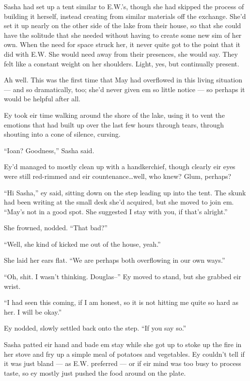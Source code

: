 Sasha had set up a tent similar to E.W.'s, though she had skipped the process of building it herself, instead creating from similar materials off the exchange. She'd set it up nearly on the other side of the lake from their house, so that she could have the solitude that she needed without having to create some new sim of her own. When the need for space struck her, it never quite got to the point that it did with E.W. She would need away from their presences, she would say. They felt like a constant weight on her shoulders. Light, yes, but continually present.

Ah well. This was the first time that May had overflowed in this living situation — and so dramatically, too; she'd never given em so little notice — so perhaps it would be helpful after all.

Ey took eir time walking around the shore of the lake, using it to vent the emotions that had built up over the last few hours through tears, through shouting into a cone of silence, cursing.

``Ioan? Goodness,'' Sasha said.

Ey'd managed to mostly clean up with a handkerchief, though clearly eir eyes were still red-rimmed and eir countenance\ldots well, who knew? Glum, perhaps?

``Hi Sasha,'' ey said, sitting down on the step leading up into the tent. The skunk had been writing at the small desk she'd acquired, but she moved to join em. ``May's not in a good spot. She suggested I stay with you, if that's alright.''

She frowned, nodded. ``That bad?''

``Well, she kind of kicked me out of the house, yeah.''

She laid her ears flat. ``We are perhaps both overflowing in our own ways.''

``Oh, shit. I wasn't thinking. Douglas--'' Ey moved to stand, but she grabbed eir wrist.

``I had seen this coming, if I am honest, so it is not hitting me quite so hard as her. I will be okay.''

Ey nodded, slowly settled back onto the step. ``If you say so.''

Sasha patted eir hand and bade em stay while she got up to stoke up the fire in her stove and fry up a simple meal of potatoes and vegetables. Ey couldn't tell if it was just bland — as E.W. preferred — or if eir mind was too busy to process taste, so ey mostly just pushed the food around on the plate.

